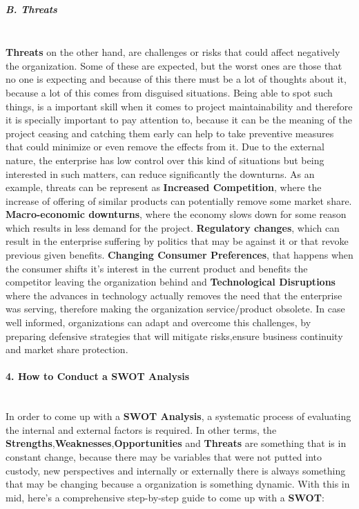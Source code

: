 \subparagraph{B. Threats}\mbox{}\\
\textbf{Threats} on the other hand, are challenges or risks that could affect negatively the organization. Some of these are expected, but the worst ones are those that no one is expecting and because of this there must be a lot of thoughts about it, because a lot of this comes from disguised situations. Being able to spot such things, is a important skill when it comes to project maintainability and therefore it is specially important to pay attention to, because it can be the meaning of the project ceasing and catching them early can help to take preventive measures that could minimize or even remove the effects from it. Due to the external nature, the enterprise has low control over this kind of situations but being interested in such matters, can reduce significantly the downturns.
As an example, threats can be represent as \textbf{Increased Competition}, where the increase of offering of similar products can potentially remove some market share. \textbf{Macro-economic downturns}, where the economy slows down for some reason which results in less demand for the project. \textbf{Regulatory changes}, which can result in the enterprise suffering by politics that may be against it or that revoke previous given benefits. \textbf{Changing Consumer Preferences}, that happens when the consumer shifts it's interest in the current product and benefits the competitor leaving the organization behind and \textbf{Technological Disruptions} where the advances in technology actually removes the need that the enterprise was serving, therefore making the organization service/product obsolete.
In case well informed, organizations can adapt and overcome this challenges, by preparing defensive strategies that will mitigate risks,ensure business continuity and market share protection.

\paragraph{4. How to Conduct a SWOT Analysis}\mbox{}\\
In order to come up with a \textbf{SWOT Analysis}, a systematic process of evaluating the internal and external factors is required. In other terms, the \textbf{Strengths},\textbf{Weaknesses},\textbf{Opportunities} and \textbf{Threats} are something that is in constant change, because there may be variables that were not putted into custody, new perspectives and internally or externally there is always something that may be changing because a organization is something dynamic. 
With this in mid, here's a comprehensive step-by-step guide to come up with a \textbf{SWOT}:  

